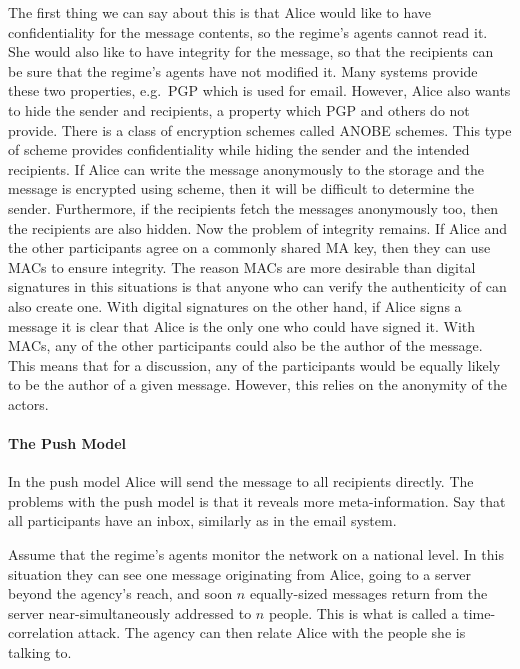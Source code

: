 The first thing we can say about this is that Alice would like to have 
confidentiality for the message contents, so the regime's agents cannot read 
it.
She would also like to have integrity for the message, so that the recipients 
can be sure that the regime's agents have not modified it.
Many systems provide these two properties, e.g.\ \ac{PGP} which is used for 
email.
However, Alice also wants to hide the sender and recipients, a property which 
\ac{PGP} and others do not provide.
There is a class of encryption schemes called \ac{ANOBE} schemes.
This type of scheme provides confidentiality while hiding the sender and the 
intended recipients.
If Alice can write the message anonymously to the storage and the message is 
encrypted using  scheme, then it will be difficult to determine the 
sender.
Furthermore, if the recipients fetch the messages anonymously too, then the 
recipients are also hidden.
Now the problem of integrity remains.
If Alice and the other participants agree on a commonly shared \ac{MA} key, 
then they can use \acp{MAC} to ensure integrity.
The reason \acp{MAC} are more desirable than digital signatures in this 
situations is that anyone who can verify the authenticity of  can also 
create one.
With digital signatures on the other hand, if Alice signs a message it is clear 
that Alice is the only one who could have signed it.
With \acp{MAC}, any of the other participants could also be the author of the 
message.
This means that for a discussion, any of the participants would be equally 
likely to be the author of a given message.
However, this relies on the anonymity of the actors.

\paragraph{The Push Model}
In the push model Alice will send the message to all recipients directly.
The problems with the push model is that it reveals more meta-information.
Say that all participants have an inbox, similarly as in the email system.

Assume that the regime's agents monitor the network on a national level.
In this situation they can see one message originating from Alice, going to 
a server beyond the agency's reach, and soon \(n\) equally-sized messages 
return from the server near-simultaneously addressed to \(n\) people.
This is what is called a time-correlation attack.
The agency can then relate Alice with the people she is talking to.

